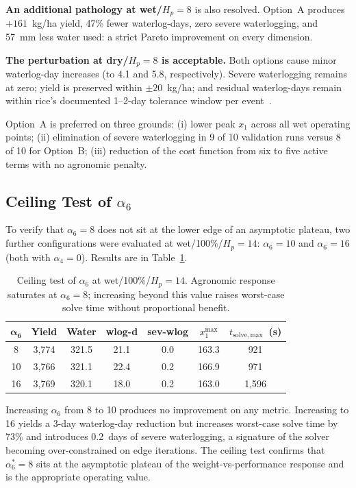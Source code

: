 \textbf{An additional pathology at wet/$H_p=8$} is also resolved. Option~A
produces $+161$~kg/ha yield, 47\% fewer waterlog-days, zero severe
waterlogging, and 57~mm less water used: a strict Pareto improvement on every
dimension.

\textbf{The perturbation at dry/$H_p=8$ is acceptable.} Both options cause
minor waterlog-day increases (to 4.1 and 5.8, respectively). Severe
waterlogging remains at zero; yield is preserved within $\pm 20$~kg/ha; and
residual waterlog-days remain within rice's documented 1--2-day tolerance
window per event~\cite{setter1997}.

Option~A is preferred on three grounds: (i) lower peak $x_1$ across all
wet operating points; (ii) elimination of severe waterlogging in 9 of 10
validation runs versus 8 of 10 for Option~B; (iii) reduction of the cost
function from six to five active terms with no agronomic penalty.

\subsection{Ceiling Test of \texorpdfstring{$\alpha_6$}{Alpha6}}
\label{ssec:ctrl-sweep-ceiling}

To verify that $\alpha_6 = 8$ does not sit at the lower edge of an
asymptotic plateau, two further configurations were evaluated at
wet/100\%/$H_p=14$: $\alpha_6 = 10$ and $\alpha_6 = 16$ (both with
$\alpha_4 = 0$). Results are in Table~\ref{tab:sweep-ceiling}.

\begin{table}[h]
\centering
\caption{Ceiling test of $\alpha_6$ at wet/100\%/$H_p=14$. Agronomic
response saturates at $\alpha_6 = 8$; increasing beyond this value
raises worst-case solve time without proportional benefit.}
\label{tab:sweep-ceiling}
\begin{tabular}{ccccccc}
\toprule
$\boldsymbol{\alpha_6}$ & \textbf{Yield} & \textbf{Water}
  & \textbf{wlog-d} & \textbf{sev-wlog} & $x_1^{\mathrm{max}}$
  & $t_{\mathrm{solve,max}}$~(s) \\
\midrule
 8 & 3{,}774 & 321.5 & 21.1 & 0.0 & 163.3 &  921 \\
10 & 3{,}766 & 321.1 & 22.4 & 0.2 & 166.9 &  971 \\
16 & 3{,}769 & 320.1 & 18.0 & 0.2 & 163.0 & 1{,}596 \\
\bottomrule
\end{tabular}
\end{table}

Increasing $\alpha_6$ from 8 to 10 produces no improvement on any metric.
Increasing to 16 yields a 3-day waterlog-day reduction but increases
worst-case solve time by 73\% and introduces 0.2~days of severe waterlogging,
a signature of the solver becoming over-constrained on edge iterations. The
ceiling test confirms that $\alpha_6^* = 8$ sits at the asymptotic plateau
of the weight-vs-performance response and is the appropriate operating value.

